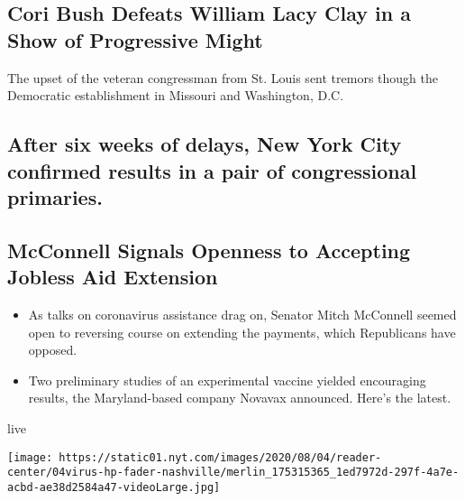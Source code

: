 \href{/2020/08/05/us/politics/cori-bush-missouri-william-lacy-clay.html}{}

\hypertarget{cori-bush-defeats-william-lacy-clay-in-a-show-of-progressive-might}{%
\subsection{Cori Bush Defeats William Lacy Clay in a Show of Progressive
Might}\label{cori-bush-defeats-william-lacy-clay-in-a-show-of-progressive-might}}

The upset of the veteran congressman from St. Louis sent tremors though
the Democratic establishment in Missouri and Washington, D.C.

\href{/2020/08/04/nyregion/maloney-torres-ny-congressional-races.html}{}

\hypertarget{after-six-weeks-of-delays-new-york-city-confirmed-results-in-a-pair-of-congressional-primaries}{%
\subsection{After six weeks of delays, New York City confirmed results
in a pair of congressional
primaries.}\label{after-six-weeks-of-delays-new-york-city-confirmed-results-in-a-pair-of-congressional-primaries}}

\href{/2020/08/04/world/coronavirus-cases.html}{}

\hypertarget{mcconnell-signals-openness-to-accepting-jobless-aid-extension}{%
\subsection{McConnell Signals Openness to Accepting Jobless Aid
Extension}\label{mcconnell-signals-openness-to-accepting-jobless-aid-extension}}

\begin{itemize}
\tightlist
\item
  As talks on coronavirus assistance drag on, Senator Mitch McConnell
  seemed open to reversing course on extending the payments, which
  Republicans have opposed.
\item
  Two preliminary studies of an experimental vaccine yielded encouraging
  results, the Maryland-based company Novavax announced. Here's the
  latest.
\end{itemize}

live

\texttt{[image: https://static01.nyt.com/images/2020/08/04/reader-center/04virus-hp-fader-nashville/merlin\_175315365\_1ed7972d-297f-4a7e-acbd-ae38d2584a47-videoLarge.jpg]}


